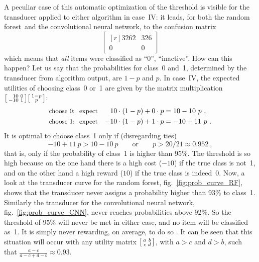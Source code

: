 \documentclass[\ifafour a4paper,12pt,\else a5paper,10pt,\fi%
onecolumn,oneside,article,%
british%
]{memoir}
\theoremstyle{remark}
\theoremstyle{innote}
\newcommand*{\p}{\mathrm{p}}%
\renewcommand*{\|}[1][]{\nonscript\:#1\vert\nonscript\:\mathopen{}}
\newcommand*{\fig}{fig.}%
\newcommand*{\cf}{{cf.}}
\newcommand*{\texts}[1]{\text{\small #1}}
\newcommand*{\RF}{random forest}
\newcommand*{\CNN}{convolutional neural network}
\newcommand*{\umatrix}[4]{\begin{bmatrix*}[r]#1&#2\\#3&#4\end{bmatrix*}}
\newcommand*{\sumatrix}[4]{\begin{bsmallmatrix*}[r]#1&#2\\#3&#4\end{bsmallmatrix*}}
\begin{document}
A peculiar case of this automatic optimization of the threshold is visible for the transducer applied to either algorithm in case~IV: it leads, for both the \RF\ and the \CNN, to the confusion matrix
\begin{equation}
  \label{eq:peculiar_CM}
  \umatrix{3262}{326}{0}{0}
\end{equation}
which means that \emph{all} items were classified as \enquote{0}, \enquote{inactive}. How can this happen? Let us say that the probabilities for class~0 and~1, determined by the transducer from algorithm output, are $1-p$ and $p$. In case~IV, the expected utilities of choosing class~0 or~1 are given by the matrix multiplication $\sumatrix{10}{0}{-10}{1} \begin{bsmallmatrix}1-p\\p\end{bsmallmatrix}$:
\begin{equation}
  \label{eq:expe_utilities_peculiar}
  \begin{aligned}
    \texts{choose 0:\; expect}&& 10 \cdot (1-p) + 0 \cdot p &= 10 - 10\ p \ ,
                                                            \\
    \texts{choose 1:\; expect}&& -10 \cdot (1-p) + 1 \cdot p &= -10 + 11\ p \ .
  \end{aligned}
\end{equation}
It is optimal to choose class~1 only if (disregarding ties)
\begin{equation}
  \label{eq:when_choose_0}
  -10 + 11\ p > 10 - 10\ p
  \qquad\text{or}\qquad
  p > 20/21 \approx 0.952 \ ,
\end{equation}
that is, only if the probability of class~1 is higher than 95\%. The threshold is so high because on the one hand there is a high cost ($-10$) if the true class is not~1, and on the other hand a high reward ($10$) if the true class is indeed~0. Now, a look at the transducer curve for the \RF, \fig~\ref{fig:prob_curve_RF}, shows that the transducer never assigns a probability higher than 93\% to class~1. Similarly the transducer for the \CNN, \fig~\ref{fig:prob_curve_CNN}, never reaches probabilities above 92\%. So the threshold of 95\% will never be met in either case, and no item will be classified as~1. It is simply never rewarding, on average, to do so \autocites[\cf\ the analysis by]{drummondetal2005}. It can be seen that this situation will occur with any utility matrix $\sumatrix{a}{b}{c}{d}$, with $a>c$ and $d>b$, such that $\frac{a-c}{a-c+d-b}\approx 0.93$.
\end{document}
